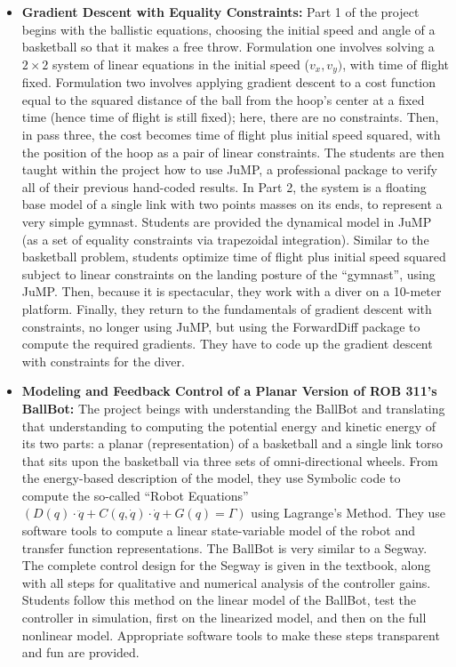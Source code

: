 \documentclass[letterpaper]{book}
\begin{document}
\begin{itemize}
\begin{itemize}
        \item \textbf{Gradient Descent with Equality Constraints:} Part 1 of the project begins with the ballistic equations, choosing the initial speed and angle of a basketball so that it makes a free throw. Formulation one involves solving a $2 \times 2$ system of linear equations in the initial speed ($v_x, v_y)$, with time of flight fixed. Formulation two involves applying gradient descent to a cost function equal to the squared distance of the ball from the hoop's center at a fixed time (hence time of flight is still fixed); here, there are no constraints. Then, in pass three, the cost becomes time of flight plus initial speed squared, with the position of the hoop as a pair of linear constraints. The students are then taught within the project how to use JuMP, a professional package to verify all of their previous hand-coded results. In Part 2, the system is a floating base model of a single link with two points masses on its ends, to represent a very simple gymnast. Students are provided the dynamical model in JuMP (as a set of equality constraints via trapezoidal integration). Similar to the basketball problem, students optimize time of flight plus initial speed squared subject to linear constraints on the landing posture of the ``gymnast'', using JuMP. Then, because it is spectacular, they work with a diver on a 10-meter platform. Finally, they return to the fundamentals of gradient descent with constraints, no longer using JuMP, but using the ForwardDiff package to compute the required gradients. They have to code up the gradient descent with constraints for the diver. 
        \item \textbf{Modeling and Feedback Control of a Planar Version of ROB 311's BallBot:} The project beings with understanding the BallBot and translating that understanding to computing the potential energy and kinetic energy of its two parts: a planar (representation) of a basketball and a single link torso that sits upon the basketball via three sets of omni-directional wheels. From the energy-based description of the model, they use Symbolic code to compute the so-called ``Robot Equations'' $\left( D(q) \cdot \ddot{q} + C(q, \dot{q}) \cdot \dot{q} + G(q) = \Gamma \right)$ using Lagrange's Method. They use software tools to compute a linear state-variable model of the robot and transfer function representations. The BallBot is very similar to a Segway. The complete control design for the Segway is given in the textbook, along with all steps for qualitative and numerical analysis of the controller gains. Students follow this method on the linear model of the BallBot, test the controller in simulation, first on the linearized model, and then on the full nonlinear model. Appropriate software tools to make these steps transparent and fun are provided. 
    \end{itemize}
\end{itemize}
\end{document}
